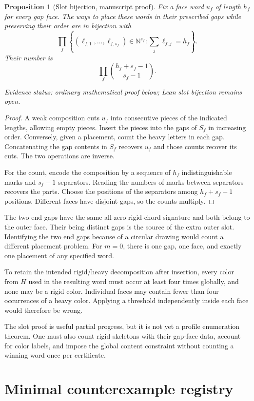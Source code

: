 \documentclass[11pt,reqno]{amsart}
\newtheorem{proposition}[theorem]{Proposition}
\theoremstyle{definition}
\newcommand{\N}{\mathbb N}
\newcommand{\status}[1]{\par\smallskip\noindent\textit{Evidence status: #1.}\par\smallskip}
\begin{document}
\begin{proposition}[Slot bijection, manuscript proof]\label{prop:slots}
Fix a face word $u_f$ of length $h_f$ for every gap face. The ways to place
these words in their prescribed gaps while preserving their order are in
bijection with
\[
 \prod_f\left\{(\ell_{f,1},\ldots,\ell_{f,s_f})\in\N^{s_f}:
                  \sum_j\ell_{f,j}=h_f\right\}.
\]
Their number is
\[
 \prod_f \binom{h_f+s_f-1}{s_f-1}.
\]
\status{ordinary mathematical proof below; Lean slot bijection remains open}
\end{proposition}
\begin{proof}
A weak composition cuts $u_f$ into consecutive pieces of the indicated
lengths, allowing empty pieces. Insert the pieces into the gaps of $S_f$ in
increasing order. Conversely, given a placement, count the heavy letters in
each gap. Concatenating the gap contents in $S_f$ recovers $u_f$ and those
counts recover its cuts. The two operations are inverse.

For the count, encode the composition by a sequence of $h_f$ indistinguishable
marks and $s_f-1$ separators. Reading the numbers of marks between separators
recovers the parts. Choose the positions of the separators among
$h_f+s_f-1$ positions. Different faces have disjoint gaps, so the counts
multiply.
\end{proof}
The two end gaps have the same all-zero rigid-chord signature and both
belong to the outer face. Their being distinct gaps is the source of the
extra outer slot. Identifying the two end gaps because of a circular drawing
would count a different placement problem. For $m=0$, there is one gap,
one face, and exactly one placement of any specified word.

To retain the intended rigid/heavy decomposition after insertion, every
color from $H$ used in the resulting word must occur at least four times
globally, and none may be a rigid color. Individual faces may contain fewer
than four occurrences of a heavy color. Applying a threshold independently
inside each face would therefore be wrong.

The slot proof is useful partial progress, but it is not yet a profile
enumeration theorem. One must also count rigid skeletons with their gap-face
data, account for color labels, and impose the global content constraint
without counting a winning word once per certificate.

\section{Minimal counterexample registry}\label{sec:counterexamples}
\end{document}
